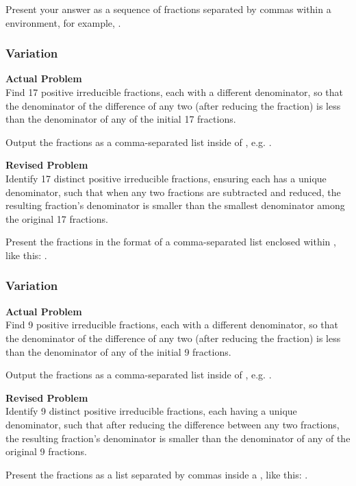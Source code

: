 Present your answer as a sequence of fractions separated by commas within a \boxed environment, for example, .

\subsubsection{Variation}
\textbf{Actual Problem}\\
Find 17 positive irreducible fractions, each with a different denominator, so that the denominator of the difference of any two (after reducing the fraction) is less than the denominator of any of the initial 17 fractions.

Output the fractions as a comma-separated list inside of \boxed, e.g. .

\textbf{Revised Problem}\\
Identify 17 distinct positive irreducible fractions, ensuring each has a unique denominator, such that when any two fractions are subtracted and reduced, the resulting fraction's denominator is smaller than the smallest denominator among the original 17 fractions.

Present the fractions in the format of a comma-separated list enclosed within \boxed, like this: .

\subsubsection{Variation}
\textbf{Actual Problem}\\
Find 9 positive irreducible fractions, each with a different denominator, so that the denominator of the difference of any two (after reducing the fraction) is less than the denominator of any of the initial 9 fractions.

Output the fractions as a comma-separated list inside of \boxed, e.g. .

\textbf{Revised Problem}\\
Identify 9 distinct positive irreducible fractions, each having a unique denominator, such that after reducing the difference between any two fractions, the resulting fraction's denominator is smaller than the denominator of any of the original 9 fractions.

Present the fractions as a list separated by commas inside a \boxed, like this: .


